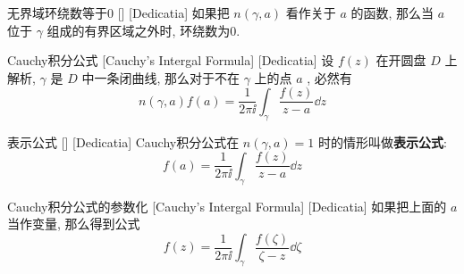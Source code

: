 \documentclass[UTF8]{ctexart}
\begin{document}
\begin{ppt}
    [UUID]
    {无界域环绕数等于0}
    []
    [Dedicatia]
    如果把 \( n(\gamma,a) \) 看作关于 \( a \) 的函数, 那么当 \( a \) 位于 \( \gamma \) 组成的有界区域之外时, 环绕数为0.
\end{ppt}
\begin{thm}
    [UUID]
    {Cauchy积分公式}
    [Cauchy's Intergal Formula]
    [Dedicatia]
    设 \( f(z) \) 在开圆盘 \( D \) 上解析,  \( \gamma \) 是 \( D \) 中一条闭曲线, 那么对于不在 \( \gamma \) 上的点 \( a \) , 必然有
    \[n(\gamma,a)f(a)=\frac{1}{2\pi\ii}\int_\gamma\frac{f(z)}{z-a}\dd{z} \]
\end{thm}
\begin{crl}
    [CauchyRepresenting]
    {表示公式}
    []
    [Dedicatia]
    Cauchy积分公式在 \( n(\gamma,a)=1 \) 时的情形叫做\textbf{表示公式}:
    \[f(a)=\frac{1}{2\pi\ii}\int_\gamma\frac{f(z)}{z-a}\dd{z}\]
\end{crl}
\begin{crl}
    [UUID]
    {Cauchy积分公式的参数化}
    [Cauchy's Intergal Formula]
    [Dedicatia]
    如果把上面的 \( a \) 当作变量, 那么得到公式
    \[f(z)=\frac{1}{2\pi\ii}\int_\gamma\frac{f(\zeta)}{\zeta-z}\dd{\zeta}\]
\end{crl}
\end{document}
